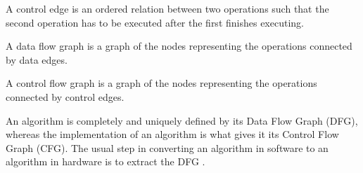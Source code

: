 \begin{defn}
  A control edge is an ordered relation between two operations such
  that the second operation has to be executed after the first finishes
  executing.
\end{defn}

\begin{defn}
  A data flow graph is a graph of the nodes representing the
  operations connected by data edges.
\end{defn}

\begin{defn}
  A control flow graph is a graph of the nodes representing the
  operations connected by control edges.
\end{defn}

An algorithm is completely and uniquely defined by its Data Flow Graph
(DFG), whereas the implementation of an algorithm is what gives it its
Control Flow Graph (CFG). The usual step in converting an algorithm in
software to an algorithm in hardware is to extract the DFG
\cite{Schaumont}.

